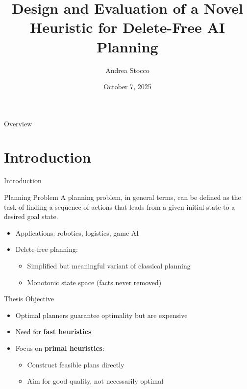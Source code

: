 \documentclass[aspectratio=169,xcolor=dvipsnames]{beamer}
\title{Design and Evaluation of a Novel Heuristic for Delete-Free AI Planning}
\author{Andrea Stocco}
\institute
{
    Department of Information Engineering \\
    University of Padova %
}
\date{October 7, 2025} %
\begin{document}
\begin{frame}
	\titlepage
\end{frame}

\begin{frame}{Overview}
	\tableofcontents
\end{frame}

\section{Introduction}

\begin{frame}{Introduction}
	\begin{block}{Planning Problem}
		A planning problem, in general terms, can be defined as the task of finding a sequence
		of actions that leads from a given initial state to a desired goal state.
	\end{block}
	\begin{itemize}
		\item Applications: robotics, logistics, game AI
		\item Delete-free planning:
		      \begin{itemize}
			      \item Simplified but meaningful variant of classical planning
			      \item Monotonic state space (facts never removed)
		      \end{itemize}
	\end{itemize}
\end{frame}

\begin{frame}{Thesis Objective}
	\begin{itemize}
		\item Optimal planners guarantee optimality but are expensive
		\item Need for \textbf{fast heuristics}
		\item Focus on \textbf{primal heuristics}:
		      \begin{itemize}
			      \item Construct feasible plans directly
			      \item Aim for good quality, not necessarily optimal
		      \end{itemize}
	\end{itemize}
\end{frame}
\end{document}
